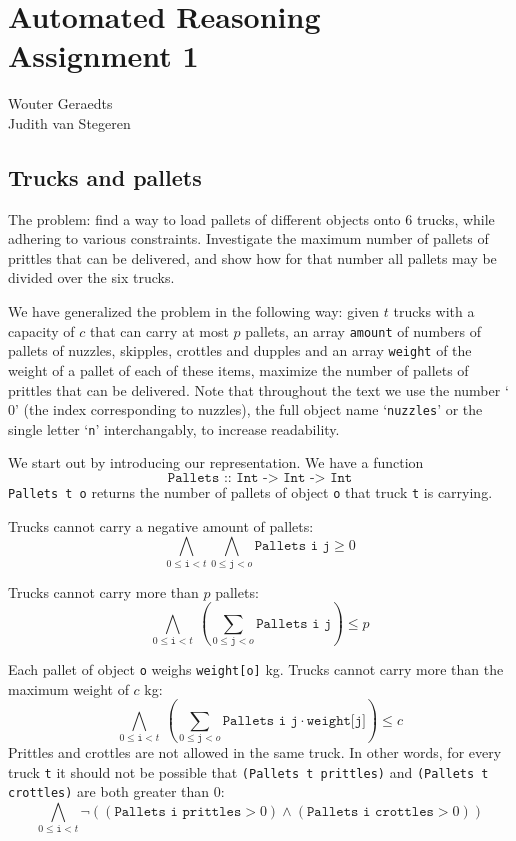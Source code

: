 \documentclass[12pt]{article}
\begin{document}
\section*{Automated Reasoning\\Assignment 1}

\begin{center}
Wouter Geraedts \\
Judith van Stegeren\\
\end{center}

\vspace{8mm}

\subsection*{Trucks and pallets}
The problem: find a way to load pallets of different objects onto 6 trucks, while adhering to various constraints. 
Investigate the maximum number of pallets of prittles that can be delivered, 
and show how for that number all pallets may be divided over the six trucks.

We have generalized the problem in the following way: given $t$ trucks with a capacity of $c$ that can carry at most $p$ pallets, an array \texttt{amount} of numbers of pallets of nuzzles, skipples, crottles and dupples and an array \texttt{weight} of the weight of a pallet of each of these items, maximize the number of pallets of prittles that can be delivered.
Note that throughout the text we use the number `$0$' (the index corresponding to nuzzles), the full object name `\texttt{nuzzles}' or the single letter `\texttt{n}' interchangably, to increase readability.

We start out by introducing our representation. We have a function 
\[\texttt{Pallets :: Int -> Int -> Int}\]
\texttt{Pallets t o} returns the number of pallets of object \texttt{o} that truck \texttt{t} is carrying.

Trucks cannot carry a negative amount of pallets:
\[ \bigwedge_{0 \le \texttt{i} < t} \bigwedge_{0 \le \texttt{j} < o} \texttt{Pallets i j} \ge 0 \]

Trucks cannot carry more than $p$ pallets:
\[ \bigwedge_{0 \le \texttt{i} < t} ~ ( \sum_{0 \le \texttt{j} < o} \texttt{Pallets i j} ) \le p \]

Each pallet of object \texttt{o} weighs \texttt{weight[o]} kg. Trucks cannot carry more than the maximum weight of $c$ kg:
\[ \bigwedge_{0 \le \texttt{i} < t} ~ (\sum_{0 \le \texttt{j} < o} \texttt{Pallets i j} \cdot \texttt{weight[j]}) \le c \]
Prittles and crottles are not allowed in the same truck. In other words, for every truck \texttt{t} it should not be possible that \texttt{(Pallets t prittles)} and \texttt{(Pallets t crottles)} are both greater than 0:
\[ \bigwedge_{0 \le \texttt{i} < t} \neg \left(( \texttt{Pallets i prittles} > 0) \wedge (\texttt{Pallets i crottles} > 0 )\right)\]
\end{document}

